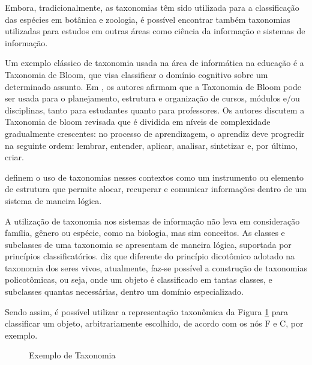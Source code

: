 \par
Embora, tradicionalmente, as taxonomias têm sido utilizada para a classificação das espécies em botânica e zoologia, é possível encontrar também taxonomias utilizadas para estudos em outras áreas como ciência da informação e sistemas de informação.
\par
Um exemplo clássico de taxonomia usada na área de informática na educação é a Taxonomia de Bloom, que visa classificar o domínio cognitivo sobre um determinado assunto. 
Em , os autores afirmam que a Taxonomia de Bloom pode ser usada para o planejamento, estrutura e organização de cursos, módulos e/ou disciplinas, tanto para estudantes quanto para professores. Os autores discutem a Taxonomia de bloom revisada que é dividida em níveis de complexidade gradualmente crescentes: no  processo de aprendizagem, o aprendiz deve progredir na seguinte ordem: lembrar, entender, aplicar, analisar, sintetizar e, por último, criar. 
\par

 definem o uso de taxonomias nesses contextos como um instrumento ou elemento de estrutura que permite alocar,
recuperar e comunicar informações dentro de um sistema de maneira lógica.

\par
A utilização de taxonomia nos sistemas de informação não leva em consideração família, gênero ou espécie, como na biologia, mas sim conceitos.
As classes e subclasses de uma taxonomia se apresentam de maneira lógica, suportada por princípios classificatórios.\cite{campos2012taxonomia}
 diz que diferente do princípio dicotômico adotado na taxonomia dos seres vivos, atualmente, faz-se possível a construção de taxonomias
policotômicas, ou seja, onde um objeto é classificado em tantas classes, e subclasses quantas necessárias, dentro um domínio especializado.

\par
Sendo assim, é possível utilizar a representação taxonômica da Figura \ref{fig:exemploTaxonomia} para classificar um objeto, arbitrariamente escolhido,
de acordo com os nós F e C, por exemplo.

\begin{figure}[!ht]
\caption{Exemplo de Taxonomia}
\label{fig:exemploTaxonomia}  
\end{figure}

